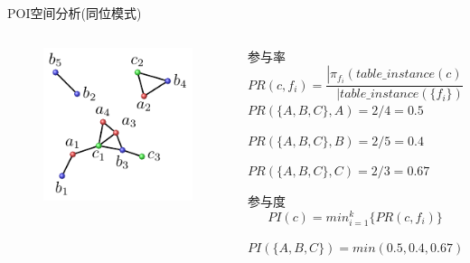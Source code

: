 

\begin{frame}[c]{POI空间分析(同位模式)}
    \begin{columns}
        \begin{column}{0.3 \textwidth}
            \begin{figure}
                \centering
                \includegraphics[scale=0.8]{figures/spatialrelation.pdf}
            \end{figure}
        \end{column}

        \begin{column}{0.7 \textwidth}
            \alert{参与率}
            \begin{equation}
                PR(c,f_i)=\frac{|\pi_{f_i}(table\_instance(c))|}{|table\_instance(\{f_i\})|}
            \end{equation}
            $PR(\{A,B,C\},A)=2/4=0.5$
            
            $PR(\{A,B,C\},B)=2/5=0.4$
            
            $PR(\{A,B,C\},C)=2/3=0.67$

            \pause
            \vspace{0.5em}
            \alert{参与度}
            \begin{equation}
                PI(c)=min_{i=1}^{k}\{PR(c,f_i)\}
            \end{equation}

            $PI(\{A,B,C\})=min(0.5,0.4,0.67)=0.4$
        \end{column}
    \end{columns}
\end{frame}

